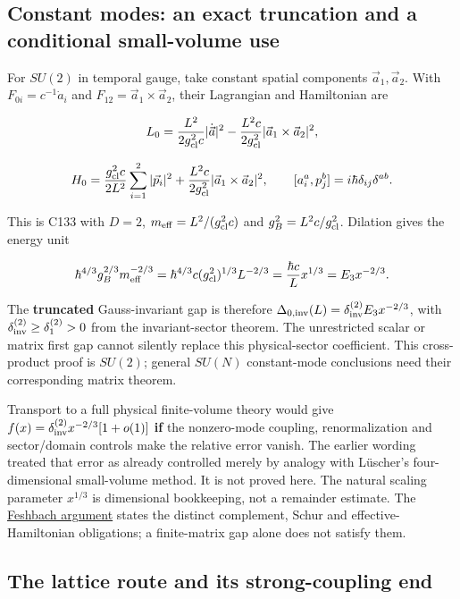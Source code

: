 \documentclass[11pt,a4paper]{article}
\begin{document}
\hypertarget{constant-modes-an-exact-truncation-and-a-conditional-small-volume-use}{%
\subsection{Constant modes: an exact truncation and a conditional
small-volume
use}\label{constant-modes-an-exact-truncation-and-a-conditional-small-volume-use}}

For \(SU(2)\) in temporal gauge, take constant spatial components
\(\vec a_1,\vec a_2\). With \(F_{0i}=c^{-1}\dot a_i\) and
\(F_{12}=\vec a_1\times\vec a_2\), their Lagrangian and Hamiltonian are

\[L_0=\frac{L^2}{2g_{\rm cl}^2c}|\dot{\vec a}|^2
 -\frac{L^2c}{2g_{\rm cl}^2}|\vec a_1\times\vec a_2|^2,\]

\[H_0=\frac{g_{\rm cl}^2c}{2L^2}\sum_{i=1}^2|\vec p_i|^2
 +\frac{L^2c}{2g_{\rm cl}^2}|\vec a_1\times\vec a_2|^2,
\qquad[a_i^a,p_j^b]=i\hbar\delta_{ij}\delta^{ab}.\]

This is C133 with \(D=2\), \(m_{\rm eff}=L^2/(g_{\rm cl}^2c)\) and
\(g_B^2=L^2c/g_{\rm cl}^2\). Dilation gives the energy unit

\[\hbar^{4/3}g_B^{2/3}m_{\rm eff}^{-2/3}
 =\hbar^{4/3}c(g_{\rm cl}^2)^{1/3}L^{-2/3}
 =\frac{\hbar c}{L}x^{1/3}=E_3x^{-2/3}.\]

The \textbf{truncated} Gauss-invariant gap is therefore
\(\Delta_{0,\rm inv}(L)=\delta_{\rm inv}^{(2)}E_3x^{-2/3}\), with
\(\delta_{\rm inv}^{(2)}\ge\delta_1^{(2)}>0\) from the invariant-sector
theorem. The unrestricted scalar or matrix first gap cannot silently
replace this physical-sector coefficient. This cross-product proof is
\(SU(2)\); general \(SU(N)\) constant-mode conclusions need their
corresponding matrix theorem.

Transport to a full physical finite-volume theory would give
\(f(x)=\delta_{\rm inv}^{(2)}x^{-2/3}[1+o(1)]\) \textbf{if} the
nonzero-mode coupling, renormalization and sector/domain controls make
the relative error vanish. The earlier wording treated that error as
already controlled merely by analogy with Lüscher's four-dimensional
small-volume method. It is not proved here. The natural scaling
parameter \(x^{1/3}\) is dimensional bookkeeping, not a remainder
estimate. The \href{weak-coupling-feshbach-reduction.md}{Feshbach
argument} states the distinct complement, Schur and
effective-Hamiltonian obligations; a finite-matrix gap alone does not
satisfy them.

\hypertarget{the-lattice-route-and-its-strong-coupling-end}{%
\subsection{The lattice route and its strong-coupling
end}\label{the-lattice-route-and-its-strong-coupling-end}}
\end{document}
